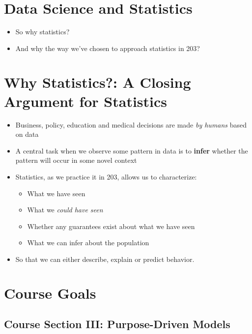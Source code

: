 \documentclass[
]{book}
\providecommand{\tightlist}{%
  \setlength{\itemsep}{0pt}\setlength{\parskip}{0pt}}
\theoremstyle{definition}
\theoremstyle{definition}
\theoremstyle{definition}
\theoremstyle{definition}
\theoremstyle{remark}
\begin{document}
\hypertarget{data-science-and-statistics}{%
\section{Data Science and Statistics}\label{data-science-and-statistics}}

\begin{itemize}
\tightlist
\item
  So why statistics?
\item
  And why the way we've chosen to approach statistics in 203?
\end{itemize}

\hypertarget{why-statistics-a-closing-argument-for-statistics}{%
\section{Why Statistics?: A Closing Argument for Statistics}\label{why-statistics-a-closing-argument-for-statistics}}

\begin{itemize}
\item
  Business, policy, education and medical decisions are made \emph{by humans} based on data
\item
  A central task when we observe some pattern in data is to \textbf{infer} whether the pattern will occur in some novel context
\item
  Statistics, as we practice it in 203, allows us to characterize:

  \begin{itemize}
  \tightlist
  \item
    What we have seen
  \item
    What we \emph{could have seen}
  \item
    Whether any guarantees exist about what we have seen
  \item
    What we can infer about the population
  \end{itemize}
\item
  So that we can either describe, explain or predict behavior.
\end{itemize}

\hypertarget{course-goals}{%
\section{Course Goals}\label{course-goals}}

\hypertarget{course-section-iii-purpose-driven-models}{%
\subsection{Course Section III: Purpose-Driven Models}\label{course-section-iii-purpose-driven-models}}
\end{document}
